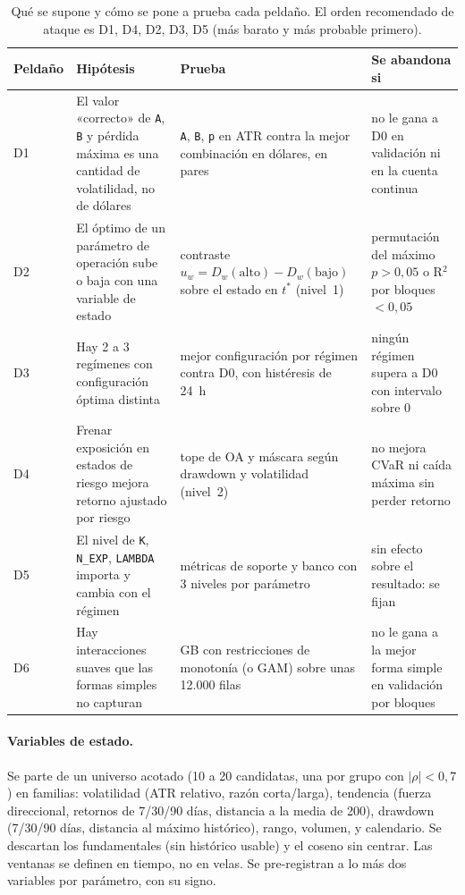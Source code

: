 \documentclass[11pt,a4paper]{article}
\newcommand{\code}[1]{\texttt{\small #1}}
\begin{document}
\begin{table}[H]
\centering\small
\begin{tabularx}{\linewidth}{lXXX}
\toprule
Peldaño & Hipótesis & Prueba & Se abandona si \\
\midrule
D1 & El valor «correcto» de \code{A}, \code{B} y pérdida máxima es una cantidad de volatilidad, no de dólares & \code{A}, \code{B}, \code{p} en ATR contra la mejor combinación en dólares, en pares & no le gana a D0 en validación ni en la cuenta continua \\
D2 & El óptimo de un parámetro de operación sube o baja con una variable de estado & contraste $u_w=D_w(\text{alto})-D_w(\text{bajo})$ sobre el estado en $t^*$ (nivel~1) & permutación del máximo $p>0{,}05$ o R$^2$ por bloques $<0{,}05$ \\
D3 & Hay 2 a 3 regímenes con configuración óptima distinta & mejor configuración por régimen contra D0, con histéresis de 24~h & ningún régimen supera a D0 con intervalo sobre 0 \\
D4 & Frenar exposición en estados de riesgo mejora retorno ajustado por riesgo & tope de OA y máscara según drawdown y volatilidad (nivel~2) & no mejora CVaR ni caída máxima sin perder retorno \\
D5 & El nivel de \code{K}, \code{N\_EXP}, \code{LAMBDA} importa y cambia con el régimen & métricas de soporte y banco con 3 niveles por parámetro & sin efecto sobre el resultado: se fijan \\
D6 & Hay interacciones suaves que las formas simples no capturan & GB con restricciones de monotonía (o GAM) sobre unas 12.000 filas & no le gana a la mejor forma simple en validación por bloques \\
\bottomrule
\end{tabularx}
\caption{Qué se supone y cómo se pone a prueba cada peldaño. El orden recomendado de ataque es D1, D4, D2, D3, D5 (más barato y más probable primero).}
\end{table}

\paragraph{Variables de estado.} Se parte de un universo acotado (10 a 20 candidatas, una por grupo con
$|\rho|<0{,}7$) en familias: volatilidad (ATR relativo, razón corta/larga), tendencia (fuerza direccional, retornos de
7/30/90 días, distancia a la media de 200), drawdown (7/30/90 días, distancia al máximo histórico), rango, volumen,
y calendario. Se descartan los fundamentales (sin histórico usable) y el coseno sin centrar. Las ventanas se
definen en tiempo, no en velas. Se pre-registran a lo más dos variables por parámetro, con su signo.
\end{document}
